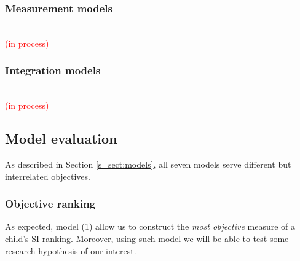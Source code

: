 \subsubsection{Measurement models} \\
%
\textcolor{red}{(in process)}

\begin{comment}
	
	Considering the intelligibility of any stimulus is determined by three interrelated parties: the message, speaker, and listener, and that the inherent variability within each integrating part could be high, the current research assumes the utterances are equivalent among each other.
	
	It will consider the correlation with the entropy measure.
	\begin{enumerate}
		\item \textbf{Dichotomous CJ (CJ-D):} the Bradley-Terry-Luce model (BTL) \citep{Bradley_et_al_1952, Luce_1959}, used when the comparative judgments are dichotomous (CJ-D), 
		\item \textbf{Ordinal CJ (CJ-O):} the Generalized Bradley-Terry-Luce model BTL(k) \citep{Tutz_1986, Agresti_1992}, used when the comparative ordinal CJ (CJ-O).
		\item \textbf{Absolute (holistic) judgments (HJ):}
	\end{enumerate}
\end{comment}
%
%
\subsubsection{Integration models} \\
%
\textcolor{red}{(in process)} \\
%
%
\subsection{Model evaluation} \label{s_sect:evaluation}
%
As described in Section \ref{s_sect:models}, all seven models serve different but interrelated objectives.
%
%
\subsubsection{Objective ranking}
%
As expected, model (1) allow us to construct the \textit{most objective} measure of a child's SI ranking. Moreover, using such model we will be able to test some research hypothesis of our interest.
%
%
